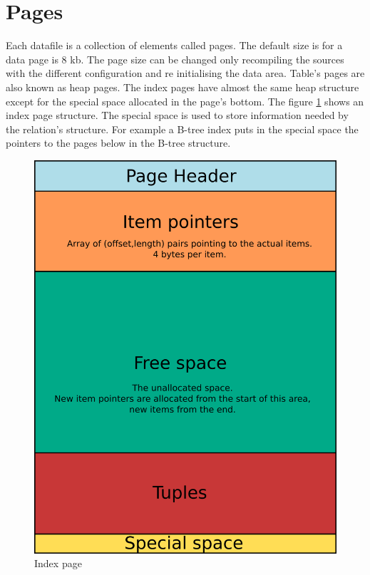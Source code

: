 \section{Pages}
Each datafile is a collection of elements called pages. The default size is for a data 
page is 8 kb. The page size can be changed only recompiling the sources with the 
different configuration and re initialising the data area. Table's pages are also 
known as heap pages. The index pages have almost the 
same heap structure except for the special space allocated in the page's bottom. The 
figure \ref{fig:INDEX01} shows an index page structure. The special  space is used 
to store information needed by the relation's structure. For example a B-tree index 
puts in the special space the pointers to the pages below in the B-tree structure.

\begin{figure}[H]
\begin{center}

\includegraphics[scale=0.35]{images/index_page_01.png}

\caption{Index page}
\label{fig:INDEX01} 
\end{center}

\end{figure}

